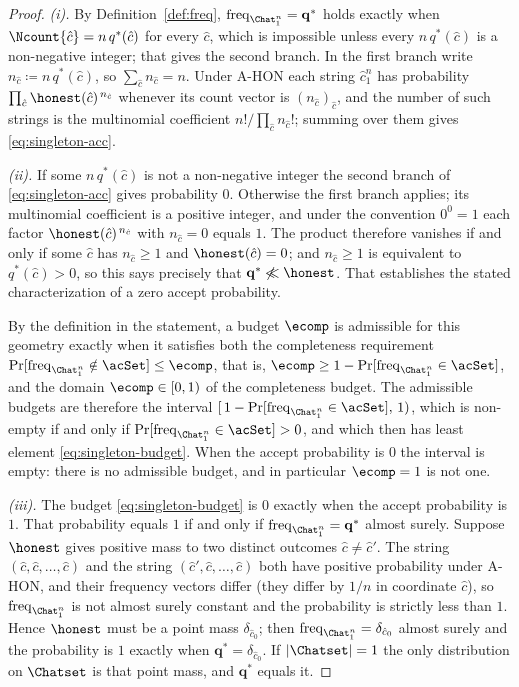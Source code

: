 \begin{proof}
\emph{(i).} By Definition~\ref{def:freq}, $\operatorname{freq}_{\Chat_1^n}=
\mathbf{q}^{\ast}$ holds exactly when $\Ncount{\hat c}=n\,q^{\ast}(\hat c)$ for
every $\hat c$, which is impossible unless every $n\,q^{\ast}(\hat c)$ is a
non-negative integer; that gives the second branch. In the first branch write
$n_{\hat c}\coloneqq n\,q^{\ast}(\hat c)$, so $\sum_{\hat c}n_{\hat c}=n$. Under
A-HON each string $\hat c_1^n$ has probability
$\prod_{\hat c}\honest(\hat c)^{\,n_{\hat c}}$ whenever its count vector is
$(n_{\hat c})_{\hat c}$, and the number of such strings is the multinomial
coefficient $n!/\prod_{\hat c}n_{\hat c}!$; summing over them gives
\eqref{eq:singleton-acc}.

\emph{(ii).} If some $n\,q^{\ast}(\hat c)$ is not a non-negative integer the
second branch of \eqref{eq:singleton-acc} gives probability $0$. Otherwise the
first branch applies; its multinomial coefficient is a positive integer, and
under the convention $0^{0}=1$ each factor $\honest(\hat c)^{\,n_{\hat c}}$
with $n_{\hat c}=0$ equals $1$. The product therefore vanishes if and only if
some $\hat c$ has $n_{\hat c}\ge1$ and $\honest(\hat c)=0$; and $n_{\hat c}\ge1$
is equivalent to $q^{\ast}(\hat c)>0$, so this says precisely that
$\mathbf{q}^{\ast}\not\ll\honest$. That establishes the stated
characterization of a zero accept probability.

By the definition in the statement, a budget $\ecomp$ is admissible for this
geometry exactly when it satisfies both the completeness requirement
$\Pr[\operatorname{freq}_{\Chat_1^n}\notin\acSet]\le\ecomp$, that is,
$\ecomp\ge1-\Pr[\operatorname{freq}_{\Chat_1^n}\in\acSet]$, and the domain
$\ecomp\in[0,1)$ of the completeness budget. The admissible budgets
are therefore the interval
$[\,1-\Pr[\operatorname{freq}_{\Chat_1^n}\in\acSet],\,1)$, which is non-empty
if and only if $\Pr[\operatorname{freq}_{\Chat_1^n}\in\acSet]>0$, and which
then has least element \eqref{eq:singleton-budget}. When the accept
probability is $0$ the interval is empty: there is no admissible budget, and
in particular $\ecomp=1$ is not one.

\emph{(iii).} The budget \eqref{eq:singleton-budget} is $0$ exactly when the
accept probability is $1$. That probability equals $1$ if and only if
$\operatorname{freq}_{\Chat_1^n}=\mathbf{q}^{\ast}$ almost surely. Suppose
$\honest$ gives positive mass to two distinct outcomes $\hat c\neq\hat c'$.
The string $(\hat c,\hat c,\dots,\hat c)$ and the string
$(\hat c',\hat c,\dots,\hat c)$ both have positive probability under A-HON, and
their frequency vectors differ (they differ by $1/n$ in coordinate $\hat c$),
so $\operatorname{freq}_{\Chat_1^n}$ is not almost surely constant and the
probability is strictly less than $1$. Hence $\honest$ must be a point mass
$\delta_{\hat c_0}$; then $\operatorname{freq}_{\Chat_1^n}=\delta_{\hat c_0}$
almost surely and the probability is $1$ exactly when
$\mathbf{q}^{\ast}=\delta_{\hat c_0}$. If $|\Chatset|=1$ the only distribution
on $\Chatset$ is that point mass, and $\mathbf{q}^{\ast}$ equals it.
\end{proof}
